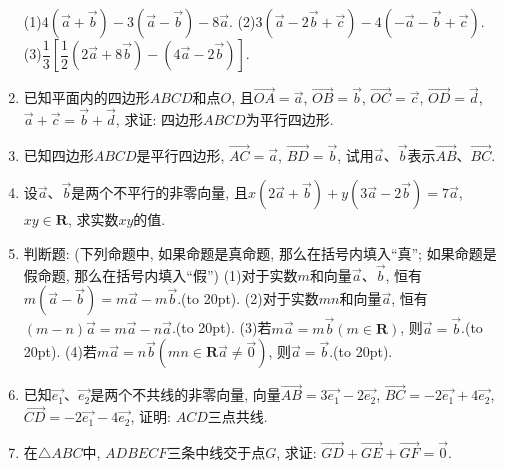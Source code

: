 \documentclass[10pt,a4paper]{article}
\newcommand{\bracket}[1]{(\hbox to #1pt{})}
\begin{document}
\begin{enumerate}[1.]
(1)$4(\overrightarrow a+\overrightarrow b)-3(\overrightarrow a-\overrightarrow b)-8\overrightarrow a$. (2)$3(\overrightarrow a-2\overrightarrow b+\overrightarrow c)-4(-\overrightarrow a-\overrightarrow b+\overrightarrow c)$.
(3)$\dfrac 13[\dfrac 12(2\overrightarrow a+8\overrightarrow b)-(4\overrightarrow a-2\overrightarrow b)]$.
\item 已知平面内的四边形$ABCD$和点$O$, 且$\overrightarrow{OA}=\overrightarrow a$, $\overrightarrow{OB}=\overrightarrow b$, $\overrightarrow{OC}=\overrightarrow c$, $\overrightarrow{OD}=\overrightarrow d$, $\overrightarrow a+\overrightarrow c=\overrightarrow b+\overrightarrow d$, 求证: 四边形$ABCD$为平行四边形.
\item 已知四边形$ABCD$是平行四边形, $\overrightarrow{AC}=\overrightarrow a$, $\overrightarrow{BD}=\overrightarrow b$, 试用$\overrightarrow a$、$\overrightarrow b$表示$\overrightarrow{AB}$、$\overrightarrow{BC}$.
\item 设$\overrightarrow a$、$\overrightarrow b$是两个不平行的非零向量, 且$x(2\overrightarrow a+\overrightarrow b)+y(3\overrightarrow a-2\overrightarrow b)=7\overrightarrow a$, $xy\in \mathbf{R}$, 求实数$xy$的值.
\item 判断题: (下列命题中, 如果命题是真命题, 那么在括号内填入``真''; 如果命题是假命题, 那么在括号内填入``假'')
(1)对于实数$m$和向量$\overrightarrow a$、$\overrightarrow b$, 恒有$m(\overrightarrow a-\overrightarrow b)=m\overrightarrow a-m\overrightarrow b$.\bracket{20}.
(2)对于实数$mn$和向量$\overrightarrow a$, 恒有$(m-n)\overrightarrow a=m\overrightarrow a-n\overrightarrow a$.\bracket{20}.
(3)若$m\overrightarrow a=m\overrightarrow b(m\in \mathbf{R})$, 则$\overrightarrow a=\overrightarrow b$.\bracket{20}.
(4)若$m\overrightarrow a=n\overrightarrow b(mn\in \mathbf{R}\overrightarrow a\ne \overrightarrow 0)$, 则$\overrightarrow a=\overrightarrow b$.\bracket{20}.
\item 已知$\overrightarrow{e_1}$、$\overrightarrow{e_2}$是两个不共线的非零向量, 向量$\overrightarrow{AB}=3\overrightarrow{e_1}-2\overrightarrow{e_2}$, $\overrightarrow{BC}=-2\overrightarrow{e_1}+4\overrightarrow{e_2}$, $\overrightarrow{CD}=-2\overrightarrow{e_1}-4\overrightarrow{e_2}$, 证明: $ACD$三点共线.
\item 在$\triangle ABC$中, $ADBECF$三条中线交于点$G$, 求证: $\overrightarrow{GD}+\overrightarrow{GE}+\overrightarrow{GF}=\overrightarrow 0$.
    

\end{enumerate}
\end{document}
